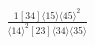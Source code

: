 \documentclass[varwidth, border=5pt]{standalone}
\begin{document}
\begin{my}
$\begin{gathered}
\scriptscriptstyle\frac{1[34]⟨15⟩⟨45⟩^2}{⟨14⟩^2[23]⟨34⟩⟨35⟩}
\end{gathered}$
\end{my}
\end{document}
